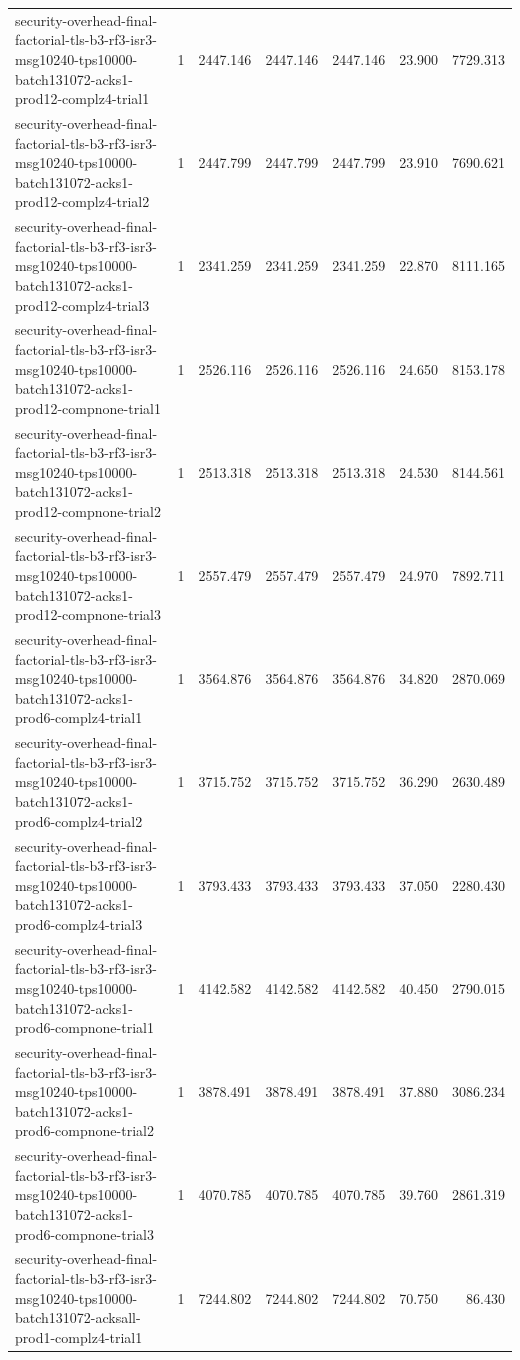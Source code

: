 \begin{tabular}{lrrrrrr}
security-overhead-final-factorial-tls-b3-rf3-isr3-msg10240-tps10000-batch131072-acks1-prod12-complz4-trial1 & 1 & 2447.146 & 2447.146 & 2447.146 & 23.900 & 7729.313 \\
security-overhead-final-factorial-tls-b3-rf3-isr3-msg10240-tps10000-batch131072-acks1-prod12-complz4-trial2 & 1 & 2447.799 & 2447.799 & 2447.799 & 23.910 & 7690.621 \\
security-overhead-final-factorial-tls-b3-rf3-isr3-msg10240-tps10000-batch131072-acks1-prod12-complz4-trial3 & 1 & 2341.259 & 2341.259 & 2341.259 & 22.870 & 8111.165 \\
security-overhead-final-factorial-tls-b3-rf3-isr3-msg10240-tps10000-batch131072-acks1-prod12-compnone-trial1 & 1 & 2526.116 & 2526.116 & 2526.116 & 24.650 & 8153.178 \\
security-overhead-final-factorial-tls-b3-rf3-isr3-msg10240-tps10000-batch131072-acks1-prod12-compnone-trial2 & 1 & 2513.318 & 2513.318 & 2513.318 & 24.530 & 8144.561 \\
security-overhead-final-factorial-tls-b3-rf3-isr3-msg10240-tps10000-batch131072-acks1-prod12-compnone-trial3 & 1 & 2557.479 & 2557.479 & 2557.479 & 24.970 & 7892.711 \\
security-overhead-final-factorial-tls-b3-rf3-isr3-msg10240-tps10000-batch131072-acks1-prod6-complz4-trial1 & 1 & 3564.876 & 3564.876 & 3564.876 & 34.820 & 2870.069 \\
security-overhead-final-factorial-tls-b3-rf3-isr3-msg10240-tps10000-batch131072-acks1-prod6-complz4-trial2 & 1 & 3715.752 & 3715.752 & 3715.752 & 36.290 & 2630.489 \\
security-overhead-final-factorial-tls-b3-rf3-isr3-msg10240-tps10000-batch131072-acks1-prod6-complz4-trial3 & 1 & 3793.433 & 3793.433 & 3793.433 & 37.050 & 2280.430 \\
security-overhead-final-factorial-tls-b3-rf3-isr3-msg10240-tps10000-batch131072-acks1-prod6-compnone-trial1 & 1 & 4142.582 & 4142.582 & 4142.582 & 40.450 & 2790.015 \\
security-overhead-final-factorial-tls-b3-rf3-isr3-msg10240-tps10000-batch131072-acks1-prod6-compnone-trial2 & 1 & 3878.491 & 3878.491 & 3878.491 & 37.880 & 3086.234 \\
security-overhead-final-factorial-tls-b3-rf3-isr3-msg10240-tps10000-batch131072-acks1-prod6-compnone-trial3 & 1 & 4070.785 & 4070.785 & 4070.785 & 39.760 & 2861.319 \\
security-overhead-final-factorial-tls-b3-rf3-isr3-msg10240-tps10000-batch131072-acksall-prod1-complz4-trial1 & 1 & 7244.802 & 7244.802 & 7244.802 & 70.750 & 86.430 \\

\end{tabular}
